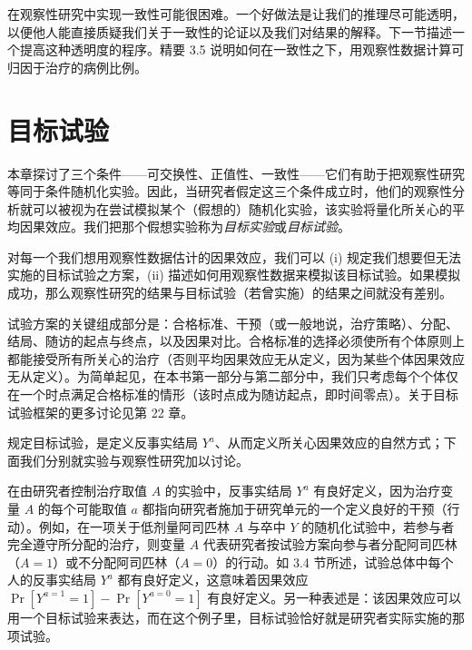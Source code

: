 在观察性研究中实现一致性可能很困难。一个好做法是让我们的推理尽可能透明，以便他人能直接质疑我们关于一致性的论证以及我们对结果的解释。下一节描述一个提高这种透明度的程序。精要 3.5 说明如何在一致性之下，用观察性数据计算可归因于治疗的病例比例。

\section{目标试验}

本章探讨了三个条件——可交换性、正值性、一致性——它们有助于把观察性研究等同于条件随机化实验。因此，当研究者假定这三个条件成立时，他们的观察性分析就可以被视为在尝试模拟某个（假想的）随机化实验，该实验将量化所关心的平均因果效应。我们把那个假想实验称为\emph{目标实验}或\emph{目标试验}。


对每一个我们想用观察性数据估计的因果效应，我们可以 (i) 规定我们想要但无法实施的目标试验之方案，(ii) 描述如何用观察性数据来模拟该目标试验。如果模拟成功，那么观察性研究的结果与目标试验（若曾实施）的结果之间就没有差别。

试验方案的关键组成部分是：合格标准、干预（或一般地说，治疗策略）、分配、结局、随访的起点与终点，以及因果对比。合格标准的选择必须使所有个体原则上都能接受所有所关心的治疗（否则平均因果效应无从定义，因为某些个体因果效应无从定义）。为简单起见，在本书第一部分与第二部分中，我们只考虑每个个体仅在一个时点满足合格标准的情形（该时点成为随访起点，即时间零点）。关于目标试验框架的更多讨论见第 22 章。


规定目标试验，是定义反事实结局 $Y^{a}$、从而定义所关心因果效应的自然方式；下面我们分别就实验与观察性研究加以讨论。

在由研究者控制治疗取值 $A$ 的实验中，反事实结局 $Y^{a}$ 有良好定义，因为治疗变量 $A$ 的每个可能取值 $a$ 都指向研究者施加于研究单元的一个定义良好的干预（行动）。例如，在一项关于低剂量阿司匹林 $A$ 与卒中 $Y$ 的随机化试验中，若参与者完全遵守所分配的治疗，则变量 $A$ 代表研究者按试验方案向参与者分配阿司匹林（$A=1$）或不分配阿司匹林（$A=0$）的行动。如 3.4 节所述，试验总体中每个人的反事实结局 $Y^{a}$ 都有良好定义，这意味着因果效应 $\Pr[Y^{a=1}=1]-\Pr[Y^{a=0}=1]$ 有良好定义。另一种表述是：该因果效应可以用一个目标试验来表达，而在这个例子里，目标试验恰好就是研究者实际实施的那项试验。


